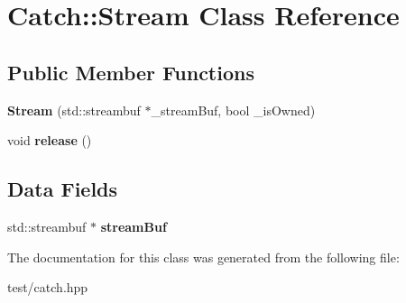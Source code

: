 \hypertarget{classCatch_1_1Stream}{}\section{Catch\+:\+:Stream Class Reference}
\label{classCatch_1_1Stream}
\subsection*{Public Member Functions}
\begin{DoxyCompactItemize}
\item 
{\bfseries Stream} (std\+::streambuf $\ast$\+\_\+stream\+Buf, bool \+\_\+is\+Owned)\hypertarget{classCatch_1_1Stream_a4d2f8a31699cda5e552372e37f78f5dc}{}\label{classCatch_1_1Stream_a4d2f8a31699cda5e552372e37f78f5dc}

\item 
void {\bfseries release} ()\hypertarget{classCatch_1_1Stream_aff188f0e04418234a6a9120a65d058f6}{}\label{classCatch_1_1Stream_aff188f0e04418234a6a9120a65d058f6}

\end{DoxyCompactItemize}
\subsection*{Data Fields}
\begin{DoxyCompactItemize}
\item 
std\+::streambuf $\ast$ {\bfseries stream\+Buf}\hypertarget{classCatch_1_1Stream_abd878112035b66f6682e4ba20ee03d72}{}\label{classCatch_1_1Stream_abd878112035b66f6682e4ba20ee03d72}

\end{DoxyCompactItemize}


The documentation for this class was generated from the following file\+:\begin{DoxyCompactItemize}
\item 
test/catch.\+hpp\end{DoxyCompactItemize}
